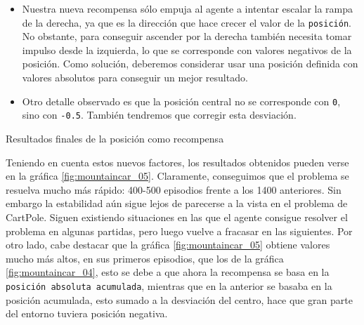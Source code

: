 \begin{itemize}
    \item Nuestra nueva recompensa sólo empuja al agente a intentar escalar la rampa de la derecha, ya que es la dirección que hace crecer el valor de la \texttt{posición}. No obstante, para conseguir ascender por la derecha también necesita tomar impulso desde la izquierda, lo que se corresponde con valores negativos de la posición. Como solución, deberemos considerar usar una posición definida con valores absolutos para conseguir un mejor resultado.
    \item Otro detalle observado es que la posición central no se corresponde con \texttt{0}, sino con \texttt{-0.5}. También tendremos que corregir esta desviación.
\end{itemize}

%
       {Resultados finales de la posición como recompensa}
 
Teniendo en cuenta estos nuevos factores, los resultados obtenidos pueden verse en la gráfica \ref{fig:mountaincar_05}. Claramente, conseguimos que el problema se resuelva mucho más rápido: 400-500 episodios frente a los 1400 anteriores. Sin embargo la estabilidad aún sigue lejos de parecerse a la vista en el problema de CartPole. Siguen existiendo situaciones en las que el agente consigue resolver el problema en algunas partidas, pero luego vuelve a fracasar en las siguientes.
Por otro lado, cabe destacar que la gráfica \ref{fig:mountaincar_05} obtiene valores mucho más altos, en sus primeros episodios, que los de la gráfica \ref{fig:mountaincar_04}, esto se debe a que ahora la recompensa se basa en la \texttt{posición absoluta acumulada}, mientras que en la anterior se basaba en la posición acumulada, esto sumado a la desviación del centro, hace que gran parte del entorno tuviera posición negativa.


